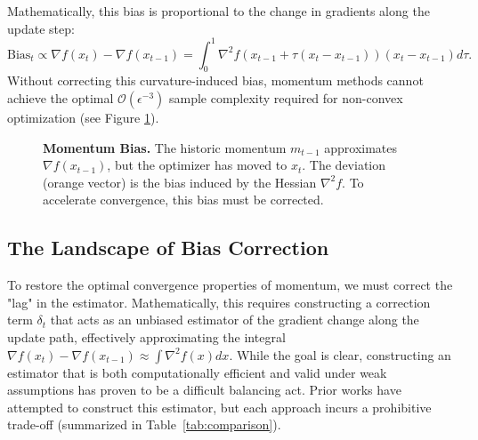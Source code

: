 \documentclass{article}
\theoremstyle{plain}
\theoremstyle{definition}
\theoremstyle{remark}
\begin{document}
Mathematically, this bias is proportional to the change in gradients along the update step:
\begin{equation}
    \label{eq:bias_def}
    \text{Bias}_t \propto \nabla f(x_t) - \nabla f(x_{t-1}) = \int_{0}^{1} \nabla^2 f(x_{t-1} + \tau(x_t - x_{t-1})) (x_t - x_{t-1}) d\tau.
\end{equation}
Without correcting this curvature-induced bias, momentum methods cannot achieve the optimal $\mathcal{O}(\epsilon^{-3})$ sample complexity required for non-convex optimization \cite{yuan2016convergence} (see Figure \ref{fig:bias_diagram}).

\begin{figure}[h]
    \centering
    \caption{\textbf{Momentum Bias.} The historic momentum $m_{t-1}$ approximates $\nabla f(x_{t-1})$, but the optimizer has moved to $x_t$. The deviation (orange vector) is the bias induced by the Hessian $\nabla^2 f$. To accelerate convergence, this bias must be corrected.}
    \label{fig:bias_diagram}
\end{figure}

\subsection{The Landscape of Bias Correction}
\label{subsec:bias_landscape}

To restore the optimal convergence properties of momentum, we must correct the "lag" in the estimator. Mathematically, this requires constructing a correction term $\delta_t$ that acts as an unbiased estimator of the gradient change along the update path, effectively approximating the integral $\nabla f(x_t) - \nabla f(x_{t-1}) \approx \int \nabla^2 f(x) dx$. While the goal is clear, constructing an estimator that is both computationally efficient and valid under weak assumptions has proven to be a difficult balancing act. Prior works have attempted to construct this estimator, but each approach incurs a prohibitive trade-off (summarized in Table~\ref{tab:comparison}).
\end{document}

